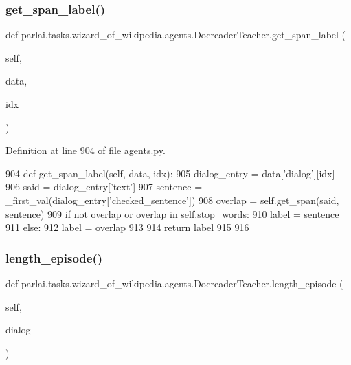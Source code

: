 \subsubsection{\texorpdfstring{get\+\_\+span\+\_\+label()}{get\_span\_label()}}
{\footnotesize\ttfamily def parlai.\+tasks.\+wizard\+\_\+of\+\_\+wikipedia.\+agents.\+Docreader\+Teacher.\+get\+\_\+span\+\_\+label (\begin{DoxyParamCaption}\item[{}]{self,  }\item[{}]{data,  }\item[{}]{idx }\end{DoxyParamCaption})}



Definition at line 904 of file agents.\+py.


\begin{DoxyCode}
904     \textcolor{keyword}{def }get\_span\_label(self, data, idx):
905         dialog\_entry = data[\textcolor{stringliteral}{'dialog'}][idx]
906         said = dialog\_entry[\textcolor{stringliteral}{'text'}]
907         sentence = \_first\_val(dialog\_entry[\textcolor{stringliteral}{'checked\_sentence'}])
908         overlap = self.get\_span(said, sentence)
909         \textcolor{keywordflow}{if} \textcolor{keywordflow}{not} overlap \textcolor{keywordflow}{or} overlap \textcolor{keywordflow}{in} self.stop\_words:
910             label = sentence
911         \textcolor{keywordflow}{else}:
912             label = overlap
913 
914         \textcolor{keywordflow}{return} label
915 
916 
\end{DoxyCode}
\mbox{\label{classparlai_1_1tasks_1_1wizard__of__wikipedia_1_1agents_1_1DocreaderTeacher_a1cb75f751dfa0b36d0f5c641c82be6c5}} 
\subsubsection{\texorpdfstring{length\+\_\+episode()}{length\_episode()}}
{\footnotesize\ttfamily def parlai.\+tasks.\+wizard\+\_\+of\+\_\+wikipedia.\+agents.\+Docreader\+Teacher.\+length\+\_\+episode (\begin{DoxyParamCaption}\item[{}]{self,  }\item[{}]{dialog }\end{DoxyParamCaption})}



